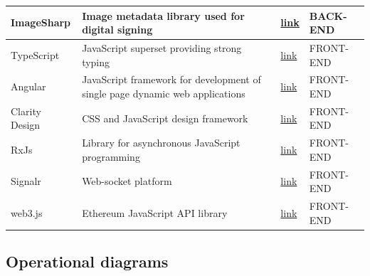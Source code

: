 \begin{table}[H]
\begin{tabular}{|p{}|p{}|p{}|p{}|}
ImageSharp     & Image metadata library used for digital signing                                       & \href{https://github.com/SixLabors/ImageSharp}{link}           & BACK-END  \\ \hline
TypeScript     & JavaScript superset providing strong typing                                           & \href{https://www.typescriptlang.org/}{link}                   & FRONT-END \\ \hline
Angular        & JavaScript framework for development of single page dynamic web applications          & \href{https://angular.io/}{link}                               & FRONT-END \\ \hline
Clarity Design & CSS and JavaScript design framework                                                   & \href{https://clarity.design/}{link}                           & FRONT-END \\ \hline
RxJs           & Library for asynchronous JavaScript programming                                       & \href{https://rxjs.dev/}{link}                                 & FRONT-END \\ \hline
Signalr        & Web-socket platform                                                                   & \href{https://www.npmjs.com/package/@microsoft/signalr}{link}  & FRONT-END \\ \hline
web3.js        & Ethereum JavaScript API library                                                       & \href{https://www.npmjs.com/package/web3}{link}                & FRONT-END \\ \hline
\end{tabular}
\end{table}

\subsection{Operational diagrams}

